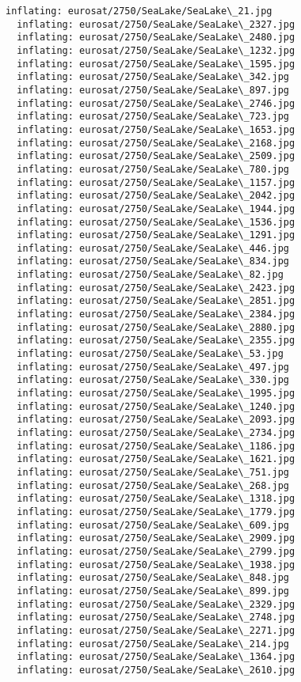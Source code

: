 \documentclass[11pt]{article}
\begin{document}
\begin{Verbatim}[commandchars=\\\{\}]
  inflating: eurosat/2750/SeaLake/SeaLake\_21.jpg
  inflating: eurosat/2750/SeaLake/SeaLake\_2327.jpg
  inflating: eurosat/2750/SeaLake/SeaLake\_2480.jpg
  inflating: eurosat/2750/SeaLake/SeaLake\_1232.jpg
  inflating: eurosat/2750/SeaLake/SeaLake\_1595.jpg
  inflating: eurosat/2750/SeaLake/SeaLake\_342.jpg
  inflating: eurosat/2750/SeaLake/SeaLake\_897.jpg
  inflating: eurosat/2750/SeaLake/SeaLake\_2746.jpg
  inflating: eurosat/2750/SeaLake/SeaLake\_723.jpg
  inflating: eurosat/2750/SeaLake/SeaLake\_1653.jpg
  inflating: eurosat/2750/SeaLake/SeaLake\_2168.jpg
  inflating: eurosat/2750/SeaLake/SeaLake\_2509.jpg
  inflating: eurosat/2750/SeaLake/SeaLake\_780.jpg
  inflating: eurosat/2750/SeaLake/SeaLake\_1157.jpg
  inflating: eurosat/2750/SeaLake/SeaLake\_2042.jpg
  inflating: eurosat/2750/SeaLake/SeaLake\_1944.jpg
  inflating: eurosat/2750/SeaLake/SeaLake\_1536.jpg
  inflating: eurosat/2750/SeaLake/SeaLake\_1291.jpg
  inflating: eurosat/2750/SeaLake/SeaLake\_446.jpg
  inflating: eurosat/2750/SeaLake/SeaLake\_834.jpg
  inflating: eurosat/2750/SeaLake/SeaLake\_82.jpg
  inflating: eurosat/2750/SeaLake/SeaLake\_2423.jpg
  inflating: eurosat/2750/SeaLake/SeaLake\_2851.jpg
  inflating: eurosat/2750/SeaLake/SeaLake\_2384.jpg
  inflating: eurosat/2750/SeaLake/SeaLake\_2880.jpg
  inflating: eurosat/2750/SeaLake/SeaLake\_2355.jpg
  inflating: eurosat/2750/SeaLake/SeaLake\_53.jpg
  inflating: eurosat/2750/SeaLake/SeaLake\_497.jpg
  inflating: eurosat/2750/SeaLake/SeaLake\_330.jpg
  inflating: eurosat/2750/SeaLake/SeaLake\_1995.jpg
  inflating: eurosat/2750/SeaLake/SeaLake\_1240.jpg
  inflating: eurosat/2750/SeaLake/SeaLake\_2093.jpg
  inflating: eurosat/2750/SeaLake/SeaLake\_2734.jpg
  inflating: eurosat/2750/SeaLake/SeaLake\_1186.jpg
  inflating: eurosat/2750/SeaLake/SeaLake\_1621.jpg
  inflating: eurosat/2750/SeaLake/SeaLake\_751.jpg
  inflating: eurosat/2750/SeaLake/SeaLake\_268.jpg
  inflating: eurosat/2750/SeaLake/SeaLake\_1318.jpg
  inflating: eurosat/2750/SeaLake/SeaLake\_1779.jpg
  inflating: eurosat/2750/SeaLake/SeaLake\_609.jpg
  inflating: eurosat/2750/SeaLake/SeaLake\_2909.jpg
  inflating: eurosat/2750/SeaLake/SeaLake\_2799.jpg
  inflating: eurosat/2750/SeaLake/SeaLake\_1938.jpg
  inflating: eurosat/2750/SeaLake/SeaLake\_848.jpg
  inflating: eurosat/2750/SeaLake/SeaLake\_899.jpg
  inflating: eurosat/2750/SeaLake/SeaLake\_2329.jpg
  inflating: eurosat/2750/SeaLake/SeaLake\_2748.jpg
  inflating: eurosat/2750/SeaLake/SeaLake\_2271.jpg
  inflating: eurosat/2750/SeaLake/SeaLake\_214.jpg
  inflating: eurosat/2750/SeaLake/SeaLake\_1364.jpg
  inflating: eurosat/2750/SeaLake/SeaLake\_2610.jpg

\end{Verbatim}
\end{document}
